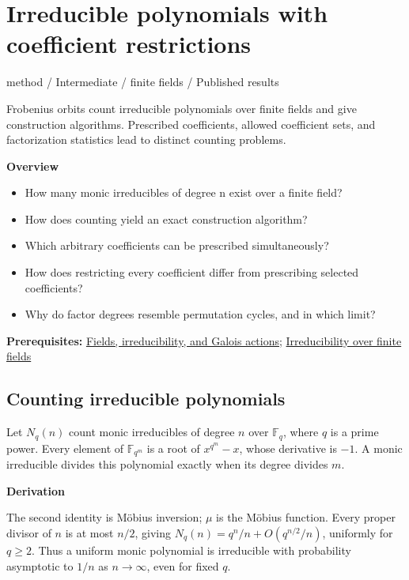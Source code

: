 \documentclass[11pt,a4paper,oneside,openany]{book}
\newcommand{\atlasdisplay}[1]{\par\begingroup\centering\vspace{3pt}\noindent\adjustbox{max width=\linewidth}{\(\displaystyle #1\)}\par\vspace{5pt}\endgroup}
\begin{document}
\chapter{Irreducible polynomials with coefficient restrictions}\label{article:finite-field-constructions}\hypertarget{article:finite-field-constructions}{}\color{black}
{\sffamily\small\color{atlasgold}method / Intermediate / finite fields / Published results}\par\medskip
Frobenius orbits count irreducible polynomials over finite fields and give construction algorithms. Prescribed coefficients, allowed coefficient sets, and factorization statistics lead to distinct counting problems.\par\medskip
\textbf{Overview}\begin{itemize}
\item How many monic irreducibles of degree n exist over a finite field?
\item How does counting yield an exact construction algorithm?
\item Which arbitrary coefficients can be prescribed simultaneously?
\item How does restricting every coefficient differ from prescribing selected coefficients?
\item Why do factor degrees resemble permutation cycles, and in which limit?
\end{itemize}
{\small\textbf{Prerequisites:} \hyperlink{article:foundations}{Fields, irreducibility, and Galois actions}; \hyperlink{article:finite-field-irreducibility}{Irreducibility over finite fields}}\par
{}\section{Counting irreducible polynomials}
\color{black} Let \(N_q(n)\) count monic irreducibles of degree \(n\) over \(\mathbb F_q\), where \(q\) is a prime power. Every element of \(\mathbb F_{q^m}\) is a root of \(x^{q^m}-x\), whose derivative is \(-1\). A monic irreducible divides this polynomial exactly when its degree divides \(m\).\par

\begin{atlasblock}[standard]
\textbf{\sffamily Derivation}\par\smallskip

\atlasdisplay{q^m=\sum_{d\mid m}dN_q(d),\qquad N_q(n)=\frac1n\sum_{d\mid n}\mu(d)q^{n/d}.}
\color{black} The second identity is Möbius inversion; \(\mu\) is the Möbius function. Every proper divisor of \(n\) is at most \(n/2\), giving \(N_q(n)=q^n/n+O(q^{n/2}/n)\), uniformly for \(q\ge2\). Thus a uniform monic polynomial is irreducible with probability asymptotic to \(1/n\) as \(n\to\infty\), even for fixed \(q\).\par
\end{atlasblock}\color{black}
\end{document}
